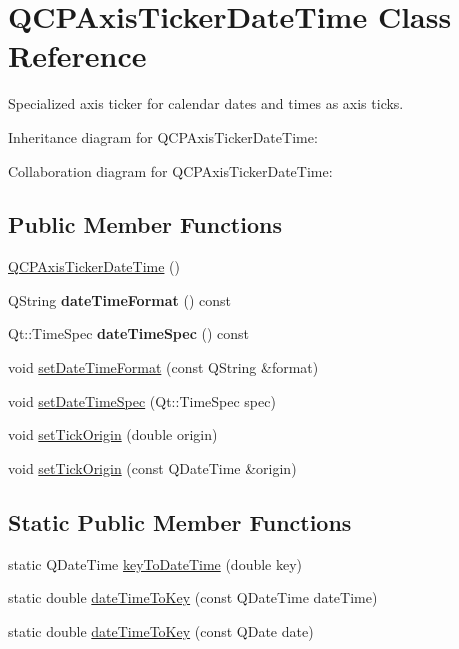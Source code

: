 \hypertarget{classQCPAxisTickerDateTime}{}\section{Q\+C\+P\+Axis\+Ticker\+Date\+Time Class Reference}
\label{classQCPAxisTickerDateTime}


Specialized axis ticker for calendar dates and times as axis ticks.  




Inheritance diagram for Q\+C\+P\+Axis\+Ticker\+Date\+Time\+:


Collaboration diagram for Q\+C\+P\+Axis\+Ticker\+Date\+Time\+:
\subsection*{Public Member Functions}
\begin{DoxyCompactItemize}
\item 
\hyperlink{classQCPAxisTickerDateTime_a84cc5c6bbc7c99c1f9bd4b3a392e1b9d}{Q\+C\+P\+Axis\+Ticker\+Date\+Time} ()
\item 
\mbox{\label{classQCPAxisTickerDateTime_aac8e2bb32ca8ff1394c42d2d62390718}} 
Q\+String {\bfseries date\+Time\+Format} () const
\item 
\mbox{\label{classQCPAxisTickerDateTime_ae688e69ba55c9247af26b6db85cf9573}} 
Qt\+::\+Time\+Spec {\bfseries date\+Time\+Spec} () const
\item 
void \hyperlink{classQCPAxisTickerDateTime_ad52660a82f688395468674d555f6a86b}{set\+Date\+Time\+Format} (const Q\+String \&format)
\item 
void \hyperlink{classQCPAxisTickerDateTime_afbd987c7197e42ab61e67fb1c38abebc}{set\+Date\+Time\+Spec} (Qt\+::\+Time\+Spec spec)
\item 
void \hyperlink{classQCPAxisTickerDateTime_a5388e048cbd32cf1ba730b9f1859eb5c}{set\+Tick\+Origin} (double origin)
\item 
void \hyperlink{classQCPAxisTickerDateTime_a2ea905872b8171847a49a5e093fb0c48}{set\+Tick\+Origin} (const Q\+Date\+Time \&origin)
\end{DoxyCompactItemize}
\subsection*{Static Public Member Functions}
\begin{DoxyCompactItemize}
\item 
static Q\+Date\+Time \hyperlink{classQCPAxisTickerDateTime_a4c1761ad057f5564804a53f942629b53}{key\+To\+Date\+Time} (double key)
\item 
static double \hyperlink{classQCPAxisTickerDateTime_aa24f293f16fff0f937bf71f4140033f1}{date\+Time\+To\+Key} (const Q\+Date\+Time date\+Time)
\item 
static double \hyperlink{classQCPAxisTickerDateTime_ad87afc7dba65843f68da5ca88bc004f4}{date\+Time\+To\+Key} (const Q\+Date date)
\end{DoxyCompactItemize}
